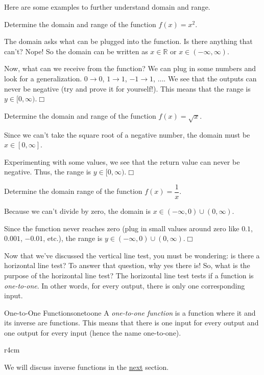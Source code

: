 \documentclass[lang=en,11pt]{elegantbook}
\begin{document}
Here are some examples to further understand domain and range.
\begin{example}
Determine the domain and range of the function $f(x)=x^2$.
\end{example}
\begin{solution}
The domain asks what can be plugged into the function.  Is there anything that can't?  Nope!  So the domain can be written as $x\in\mathbb{R}$ or $x\in(-\infty,\infty)$.

Now, what can we receive from the function?  We can plug in some numbers and look for a generalization.  $0 \to 0$, $1 \to 1$, $-1 \to 1$, $\ldots$.  We see that the outputs can never be negative (try and prove it for yourself!).  This means that the range is $y\in[0,\infty)$.$\Box$
\end{solution}
\begin{example}
Determine the domain and range of the function $f(x)=\sqrt{x}$.
\end{example}
\begin{solution}
Since we can't take the square root of a negative number, the domain must be $x\in[0,\infty]$.

Experimenting with some values, we see that the return value can never be negative.  Thus, the range is $y\in[0,\infty)$.$\Box$
\end{solution}
\begin{example}
Determine the domain range of the function $f(x)=\dfrac{1}{x}$.
\end{example}
\begin{solution}
Because we can't divide by zero, the domain is $x\in(-\infty,0)\cup(0,\infty)$.

Since the function never reaches zero (plug in small values around zero like $0.1$, $0.001$, $-0.01$, etc.), the range is $y\in(-\infty,0)\cup(0,\infty)$.$\Box$
\end{solution}
Now that we've discussed the vertical line test, you must be wondering: is there a horizontal line test?  To answer that question, why yes there is! So, what is the purpose of the horizontal line test? The horizontal line test tests if a function is \textit{one-to-one}.  In other words, for every output, there is only one corresponding input.  
\begin{definition}{One-to-One Functions}{onetoone}
A \textit{one-to-one function} is a function where it and its inverse are functions.  This means that there is one input for every output and one output for every input (hence the name one-to-one).
\end{definition}
\begin{wrapfigure}{r}{4cm}
\end{wrapfigure}
We will discuss inverse functions in the \hyperlink{section.2.3}{next} section.
\end{document}
